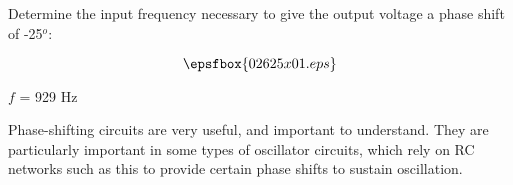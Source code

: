 

Determine the input frequency necessary to give the output voltage a phase shift of -25$^{o}$:

$$\epsfbox{02625x01.eps}$$







$f$ = 929 Hz







Phase-shifting circuits are very useful, and important to understand.  They are particularly important in some types of oscillator circuits, which rely on RC networks such as this to provide certain phase shifts to sustain oscillation.




